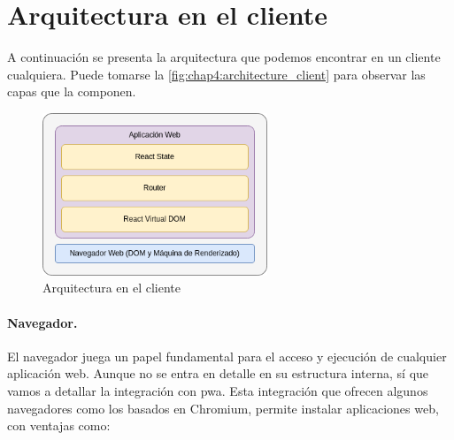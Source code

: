\section{Arquitectura en el cliente}

A continuación se presenta la arquitectura que podemos encontrar en un cliente cualquiera. Puede tomarse la \autoref{fig:chap4:architecture_client} para observar las capas que la componen.

\begin{figure}[h]
	\centering
	\includegraphics[width=0.6\textwidth]{img/client.png}
	\caption{Arquitectura en el cliente}
	\label{fig:chap4:architecture_client}
\end{figure}

\paragraph{Navegador.} El navegador juega un papel fundamental para el acceso y ejecución de cualquier aplicación web. Aunque no se entra en detalle en su estructura interna, sí que vamos a detallar la integración con \acrfull{pwa}. Esta integración que ofrecen algunos navegadores como los basados en Chromium, permite instalar aplicaciones web, con ventajas como:

